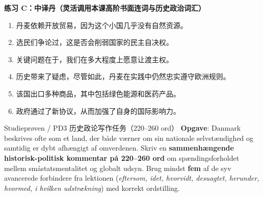 \textbf{练习 C：中译丹（灵活调用本课高阶书面连词与历史政治词汇）}
\begin{enumerate}
  \item 丹麦依赖开放贸易，因为这个小国几乎没有自然资源。
  \item 选民们争论过，这是否会削弱国家的民主自决权。
  \item 关键问题在于，我们在多大程度上愿意让渡主权。
  \item 历史带来了疑虑，尽管如此，丹麦在实践中仍然忠实遵守欧洲规则。
  \item 该国出口多种商品，其中包括绿色能源和医药产品。
  \item 政府通过了新协议，从而加强了自身的国际影响力。
\end{enumerate}


\begin{emailbox}{Studieprøven / PD3 历史政论写作任务（220--260 ord）}
\textbf{Opgave}: Danmark beskrives ofte som et land, der både værner om sin nationale selvstændighed og samtidig er dybt afhængigt af omverdenen. Skriv en \textbf{sammenhængende historisk-politisk kommentar på 220--260 ord} om spændingsforholdet mellem småstatsmentalitet og globalt udsyn. Brug mindst \textbf{fem} af de syv avancerede forbindere fra lektionen (\textit{eftersom, idet, hvorvidt, desuagtet, herunder, hvormed, i hvilken udstrækning}) med korrekt ordstilling.
\end{emailbox}

